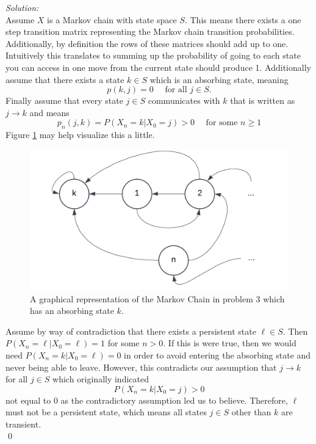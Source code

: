 \documentclass[10pt]{amsart}
\begin{document}
\noindent
\textit{Solution:} \\
Assume $X$ is a Markov chain with state space $S$.
This means there exists a one step transition matrix representing the Markov chain transition probabilities.
Additionally, by definition the rows of these matrices should add up to one.
Intuitively this translates to summing up the probability of going to each state you can access in one move from the current state should produce 1. Additionally assume that there exists a state $k \in S$ which is an absorbing state, meaning
$$p(k, j) = 0 \quad \text{ for all } j \in S.$$
Finally assume that every state $j \in S$ communicates with $k$ that is written as $j \rightarrow k$ and means
$$
p_n(j,k) = P(X_n = k | X_0 = j) > 0 \quad \text{ for some } n \geq 1
$$
Figure \ref{fig:f5} may help visualize this a little.
\begin{figure}[h]
	\centering
	\includegraphics[scale=0.5]{three_markov_graph.png}
	\caption{
		A graphical representation of the Markov Chain in problem 3 which has an absorbing state $k$.
	}\label{fig:f5}
\end{figure}
Assume by way of contradiction that there exists a persistent state $\ell \in S$.
Then $P(X_n = \ell | X_0 = \ell) = 1$ for some $n > 0$.
If this is were true, then we would need $P(X_n = k | X_0 = \ell) = 0$ in order to avoid entering the absorbing state and never being able to leave.
However, this contradicts our assumption that $j \rightarrow k$ for all $j \in S$ which originally indicated
$$
P(X_n = k | X_0 = j) > 0
$$
not equal to 0 as the contradictory assumption led us to believe.
Therefore, $\ell$ must not be a persistent state, which means all states $j \in S$ other than $k$ are transient. \\
\qed \\

\newpage
\end{document}
